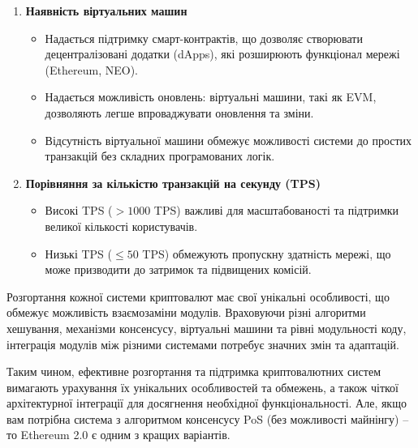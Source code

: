 \begin{enumerate}
    \item \textbf{Наявність віртуальних машин}
    \begin{itemize}
        \item Надається підтримку смарт-контрактів, що дозволяє створювати децентралізовані додатки (dApps), які розширюють функціонал мережі (Ethereum, NEO).
        \item Надається можливість оновлень: віртуальні машини, такі як EVM, дозволяють легше впроваджувати оновлення та зміни.
        \item Відсутність віртуальної машини обмежує можливості системи до простих транзакцій без складних програмованих логік.
    \end{itemize}

    \item \textbf{Порівняння за кількістю транзакцій на секунду (TPS)}
    \begin{itemize}
        \item Високі TPS ($> 1000$ TPS) важливі для масштабованості та підтримки великої кількості користувачів.
        \item Низькі TPS ($\leq 50$ TPS) обмежують пропускну здатність мережі, що може призводити до затримок та підвищених комісій.
    \end{itemize}
\end{enumerate}

\newpage
\chapconclude{\ref{chap:theory}}

Розгортання кожної системи криптовалют має свої унікальні особливості, що обмежує можливість взаємозаміни модулів. Враховуючи різні алгоритми хешування, механізми консенсусу, віртуальні машини та рівні модульності коду, інтеграція модулів між різними системами потребує значних змін та адаптацій.

Таким чином, ефективне розгортання та підтримка криптовалютних систем вимагають урахування їх унікальних особливостей та обмежень, а також чіткої архітектурної інтеграції для досягнення необхідної функціональності. Але, якщо вам потрібна система з алгоритмом консенсусу PoS (без можливості майнінгу) -- то Ethereum 2.0 є одним з кращих варіантів.